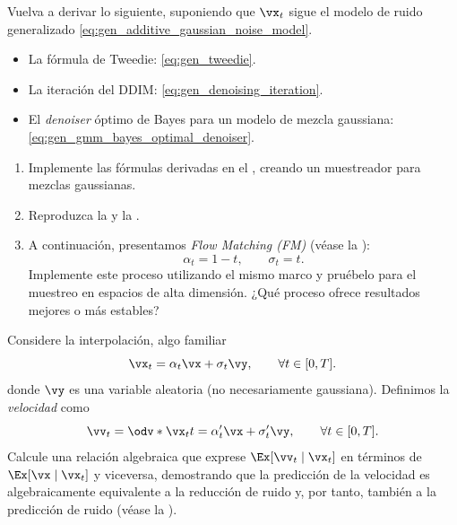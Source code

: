 \documentclass[../../book-main.tex]{subfiles}
\begin{document}
\begin{exercise}\label{exercise:generalizing_results_to_different_noise_models}
    Vuelva a derivar lo siguiente, suponiendo que \(\vx_{t}\) sigue el modelo de ruido generalizado
    \eqref{eq:gen_additive_gaussian_noise_model}.
    \begin{itemize}
        \item La fórmula de Tweedie: \eqref{eq:gen_tweedie}.
        \item La iteración del DDIM: \eqref{eq:gen_denoising_iteration}.
        \item El \textit{denoiser} óptimo de Bayes para un modelo de mezcla gaussiana:
            \eqref{eq:gen_gmm_bayes_optimal_denoiser}.
    \end{itemize}
\end{exercise}

\begin{exercise}\label{exercise:implement_denoising_processes}
    \phantom{}
    \begin{enumerate}
        \item Implemente las fórmulas derivadas en el
            ,
            creando un muestreador para mezclas gaussianas.
        \item Reproduzca la  y la
            .
        \item A continuación, presentamos \textit{Flow
            Matching (FM)} (véase la ):
            \begin{equation}
                \alpha_{t} = 1 - t, \qquad \sigma_{t} = t.
            \end{equation}
            Implemente este proceso utilizando el mismo marco y pruébelo
            para el muestreo en espacios de alta dimensión. ¿Qué proceso ofrece resultados mejores
            o más estables?
    \end{enumerate}
\end{exercise}

\begin{exercise}\label{exercise:velocity_prediction}
    Considere la interpolación, algo familiar
    \begin{equation}
        \vx_{t} = \alpha_{t}\vx + \sigma_{t}\vy, \qquad \forall t
        \in [0, T].
    \end{equation}
    donde \(\vy\) es una variable aleatoria (no necesariamente gaussiana).
    Definimos la \textit{velocidad} como
    \begin{equation}
        \vv_{t} = \odv*{\vx_{t}}{t} = \alpha_{t}^{\prime}\vx +
        \sigma_{t}^{\prime}\vy, \qquad \forall t \in [0, T].
    \end{equation}
    Calcule una relación algebraica que exprese \(\Ex[\vv_{t} \mid
    \vx_{t}]\) en términos de \(\Ex[\vx \mid \vx_{t}]\) y viceversa,
    demostrando que la predicción de la velocidad es algebraicamente
    equivalente a la reducción de ruido y, por tanto, también a la predicción de ruido
    (véase la ).
\end{exercise}
\end{document}
